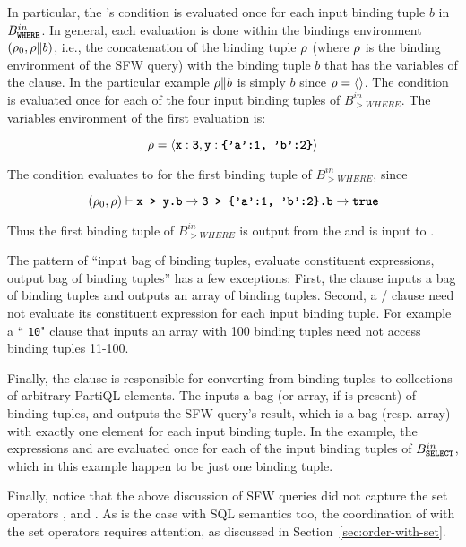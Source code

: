 In particular, the 's condition is evaluated once for each input
binding tuple $b$ in $B^{in}_{\texttt{\textbf{WHERE}}}$. In general, each evaluation is done
within the bindings environment $(\rho_{0}, \rho \| b)$, i.e., the concatenation of
the binding tuple $\rho$ (where $\rho$ is the binding environment of the SFW
query) with the binding tuple $b$ that has the variables of the 
clause. In the particular example $\rho \| b$ is simply $b$ since $\rho =
\langle \rangle$. The condition  is evaluated once for each of the
four input binding tuples of $B^{in}_{\gt{WHERE}}$. The variables environment of
the first evaluation is:

\[ 
\rho = \langle \texttt{\textbf{x}}:\texttt{\textbf{3}}, \texttt{\textbf{y}}:\texttt{\textbf{\{'a':1, 'b':2\}}} \rangle 
\] 

\noindent The  condition evaluates to  for the first
binding tuple of  $B^{in}_{\gt{WHERE}}$, since 

\[ (\rho_{0}, \rho) \vdash \texttt{\textbf{x > y.b}} \rightarrow \texttt{\textbf{3 > \{'a':1, 'b':2\}.b}} \rightarrow \texttt{\textbf{true}} \]

\noindent Thus the first binding tuple of $B^{in}_{\gt{WHERE}}$ is output from
the  and is input to .

The pattern of ``input bag of binding tuples, evaluate constituent expressions,
output bag of binding tuples'' has a few exceptions: First, the 
clause inputs a bag of binding tuples and outputs an array of binding tuples.
Second, a / clause need not evaluate its constituent
expression for each input binding tuple. For example a `` \texttt{10}"
clause that inputs an array with 100 binding tuples need not access binding
tuples 11-100. 

Finally, the  clause is responsible for converting from binding
tuples to collections of arbitrary PartiQL elements. The  inputs a
bag (or array, if  is present) of binding tuples, and outputs
the SFW query's result, which is a bag (resp. array) with exactly one element
for each input binding tuple. In the example, the  expressions 
and  are evaluated once for each of the input binding tuples of
$B^{in}_{\texttt{\textbf{SELECT}}}$, which in this example happen to be just one binding
tuple.

Finally, notice that the above discussion of SFW queries did not capture the set
operators ,  and . As is the case with SQL
semantics too, the coordination of  with the set operators requires
attention, as discussed in Section~\ref{sec:order-with-set}.

